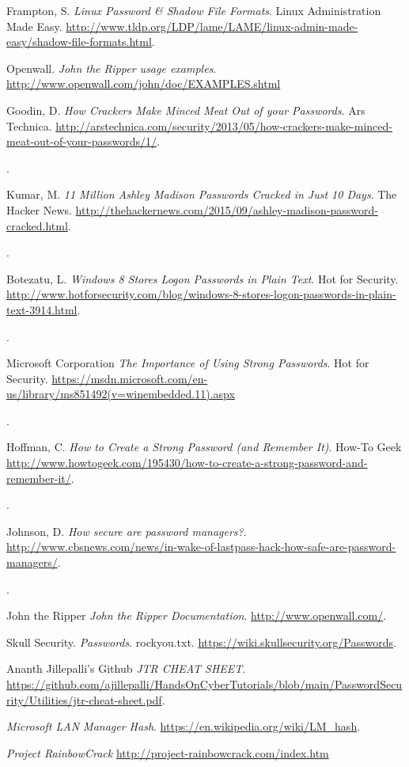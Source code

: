 \documentclass[12pt]{extarticle}
\begin{document}
\begin{thebibliography}{9}

	Frampton, S.
	\textit{Linux Password \& Shadow File Formats}.
	Linux Administration Made Easy.
	\url{http://www.tldp.org/LDP/lame/LAME/linux-admin-made-easy/shadow-file-formats.html}.

	Openwall.
	\textit{John the Ripper usage examples}.
	\url{http://www.openwall.com/john/doc/EXAMPLES.shtml}
	
Goodin, D.
\textit{How Crackers Make Minced Meat Out of your Passwords}.
Ars Technica.
\url{http://arstechnica.com/security/2013/05/how-crackers-make-minced-meat-out-of-your-passwords/1/}.
\date{May 2013}.

Kumar, M.
\textit{11 Million Ashley Madison Passwords Cracked in Just 10 Days}.
The Hacker News.
\url{http://thehackernews.com/2015/09/ashley-madison-password-cracked.html}.
\date{Sept 2015}.

Botezatu, L.
\textit{Windows 8 Stores Logon Passwords in Plain Text}.
Hot for Security.
\url{http://www.hotforsecurity.com/blog/windows-8-stores-logon-passwords-in-plain-text-3914.html}.
\date{Oct 2015}.

Microsoft Corporation
\textit{The Importance of Using Strong Passwords}.
Hot for Security.
\url{https://msdn.microsoft.com/en-us/library/ms851492(v=winembedded.11).aspx}
\date{2006}.

Hoffman, C.
\textit{How to Create a Strong Password (and Remember It)}.
How-To Geek
\url{http://www.howtogeek.com/195430/how-to-create-a-strong-password-and-remember-it/}.
\date{May 2015}.

Johnson, D.
\textit{How secure are password managers?}.
\url{http://www.cbsnews.com/news/in-wake-of-lastpass-hack-how-safe-are-password-managers/}.
\date{June 2015}.

John the Ripper
\textit{John the Ripper Documentation}.
\url{http://www.openwall.com/}.

Skull Security.
\textit{Passwords}.
rockyou.txt.
\url{https://wiki.skullsecurity.org/Passwords}.

Ananth Jillepalli's Github
\textit{JTR CHEAT SHEET}.
\url{https://github.com/ajillepalli/HandsOnCyberTutorials/blob/main/PasswordSecurity/Utilities/jtr-cheat-sheet.pdf}.

\textit{Microsoft LAN Manager Hash}.
\url{https://en.wikipedia.org/wiki/LM_hash}.

\textit{Project RainbowCrack}
\url{http://project-rainbowcrack.com/index.htm}

\end{thebibliography}
\end{document}

